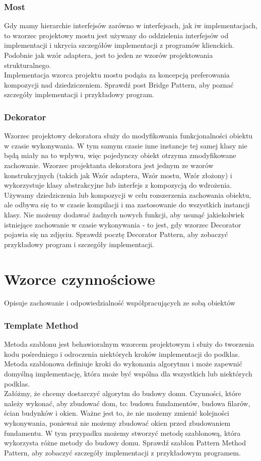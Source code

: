 \documentclass[12pt,a4paper]{article}
\begin{document}
	\section{Most}
	Gdy mamy hierarchie interfejsów zarówno w interfejsach, jak iw implementacjach, to wzorzec projektowy mostu jest używany do oddzielenia interfejsów od implementacji i ukrycia szczegółów implementacji z programów klienckich. Podobnie jak wzór adaptera, jest to jeden ze wzorów projektowania strukturalnego.\\
	Implementacja wzorca projektu mostu podąża za koncepcją preferowania kompozycji nad dziedziczeniem. Sprawdź post Bridge Pattern, aby poznać szczegóły implementacji i przykładowy program\cite{PankajKumar}.
	\section{Dekorator}
	Wzorzec projektowy dekoratora służy do modyfikowania funkcjonalności obiektu w czasie wykonywania. W tym samym czasie inne instancje tej samej klasy nie będą miały na to wpływu, więc pojedynczy obiekt otrzyma zmodyfikowane zachowanie. Wzorzec projektanta dekoratora jest jednym ze wzorów konstrukcyjnych (takich jak Wzór adaptera, Wzór mostu, Wzór złożony) i wykorzystuje klasy abstrakcyjne lub interfejs z kompozycją do wdrożenia.\\
	Używamy dziedziczenia lub kompozycji w celu rozszerzenia zachowania obiektu, ale odbywa się to w czasie kompilacji i ma zastosowanie do wszystkich instancji klasy. Nie możemy dodawać żadnych nowych funkcji, aby usunąć jakiekolwiek istniejące zachowanie w czasie wykonywania - to jest, gdy wzorzec Decorator pojawia się na zdjęciu. Sprawdź pocztę Decorator Pattern, aby zobaczyć przykładowy program i szczegóły implementacji\cite{PankajKumar}.
	\part{Wzorce czynnościowe}
	Opisuje zachowanie i odpowiedzialność współpracujących ze sobą obiektów
	\section{Template Method}
	Metoda szablonu jest behawioralnym wzorcem projektowym i służy do tworzenia kodu pośredniego i odroczenia niektórych kroków implementacji do podklas. Metoda szablonowa definiuje kroki do wykonania algorytmu i może zapewnić domyślną implementację, która może być wspólna dla wszystkich lub niektórych podklas.\\
	Załóżmy, że chcemy dostarczyć algorytm do budowy domu. Czynności, które należy wykonać, aby zbudować dom, to: budowa fundamentów, budowa filarów, ścian budynków i okien. Ważne jest to, że nie możemy zmienić kolejności wykonywania, ponieważ nie możemy zbudować okien przed zbudowaniem fundamentu. W tym przypadku możemy stworzyć metodę szablonową, która wykorzysta różne metody do budowy domu. Sprawdź szablon Pattern Method Pattern, aby zobaczyć szczegóły implementacji z przykładowym programem\cite{PankajKumar}.
\end{document}
